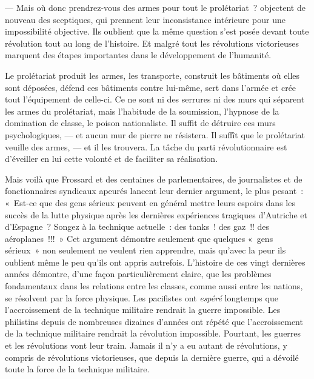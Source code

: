 \documentclass[french,twoside]{book} %
\begin{document}
— Mais où donc prendrez-vous des armes pour tout le prolétariat ? objectent de nouveau des sceptiques, qui prennent leur inconsistance intérieure pour une impossibilité objective. Ils oublient que la même question s’est posée devant toute révolution tout au long de l’histoire. Et malgré tout les révolutions victorieuses marquent des étapes importantes dans le développement de l’humanité.\par
Le prolétariat produit les armes, les transporte, construit les bâtiments où elles sont déposées, défend ces bâtiments contre lui-même, sert dans l’armée et crée tout l’équipement de celle-ci. Ce ne sont ni des serrures ni des murs qui séparent les armes du prolétariat, mais l’habitude de la soumission, l’hypnose de la domination de classe, le poison nationaliste. Il suffit de détruire ces murs psychologiques, — et aucun mur de pierre ne résistera. Il suffît que le prolétariat veuille des armes, — et il les trouvera. La tâche du parti révolutionnaire est d’éveiller en lui cette volonté et de faciliter sa réalisation.\par
Mais voilà que Frossard et des centaines de parlementaires, de journalistes et de fonctionnaires syndicaux apeurés lancent leur dernier argument, le plus pesant : « Est-ce que des gens sérieux peuvent en général mettre leurs espoirs dans les succès de la lutte physique après les dernières expériences tragiques d’Autriche et d’Espagne ?  Songez à la technique actuelle : des tanks ! des gaz !! des aéroplanes !!! » Cet argument démontre seulement que quelques « gens sérieux » non seulement ne veulent rien apprendre, mais qu’avec la peur ils oublient même le peu qu’ils ont appris autrefois. L’histoire de ces vingt dernières années démontre, d’une façon particulièrement claire, que les problèmes fondamentaux dans les relations entre les classes, comme aussi entre les nations, se résolvent par la force physique. Les pacifistes ont \emph{espéré} longtemps que l’accroissement de la technique militaire rendrait la guerre impossible. Les philistins depuis de nombreuses dizaines d’années ont répété que l’accroissement de la technique militaire rendrait la révolution impossible. Pourtant, les guerres et les révolutions vont leur train. Jamais il n’y a eu autant de révolutions, y compris de révolutions victorieuses, que depuis la dernière guerre, qui a dévoilé toute la force de la technique militaire.\par
\end{document}
